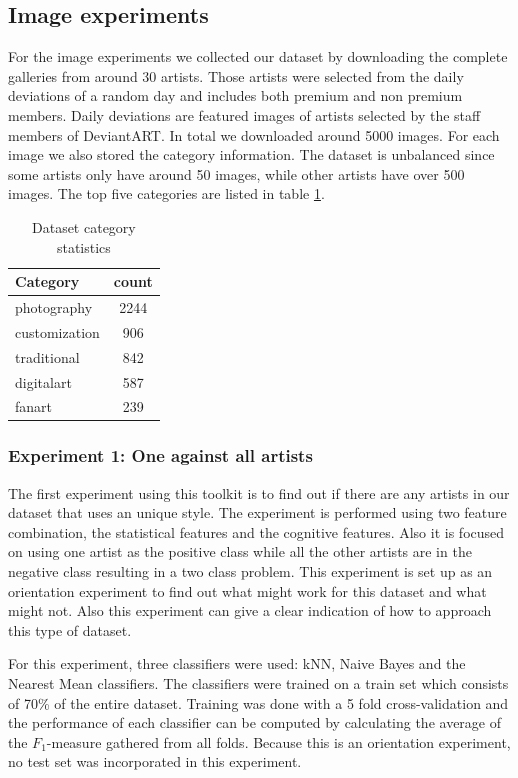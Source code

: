 \subsection{Image experiments}
For the image experiments we collected our dataset by downloading the complete galleries from around 30 artists.
Those artists were selected from the daily deviations of a random day and includes both premium and non premium members.
Daily deviations are featured images of artists selected by the staff members of DeviantART.
In total we downloaded around 5000 images. 
For each image we also stored the category information.
The dataset is unbalanced since some artists only have around 50 images, while other artists have over 500 images.
The top five categories are listed in table \ref{datasetstats}.

\begin{table}[htb]
    \centering
    \begin{tabular}
        { | l | c | } 
        \hline
        Category & count \\
        \hline
        photography & 2244 \\ 
        customization & 906 \\ 
        traditional & 842 \\ 
        digitalart & 587 \\ 
        fanart & 239 \\ 
        \hline 
    \end{tabular}
    \caption{Dataset category statistics}
    \label{datasetstats}
\end{table}

\subsubsection{Experiment 1: One against all artists}

The first experiment using this toolkit is to find out if there are any artists in our dataset that uses an unique style.
The experiment is performed using two feature combination, the statistical features and the cognitive features.
Also it is focused on using one artist as the positive class while all the other artists are in the negative class resulting in a two class problem.
This experiment is set up as an orientation experiment to find out what might work for this dataset and what might not.
Also this experiment can give a clear indication of how to approach this type of dataset.

For this experiment, three classifiers were used: kNN, Naive Bayes and the Nearest Mean classifiers.
The classifiers were trained on a train set which consists of 70\% of the entire dataset.
Training was done with a 5 fold cross-validation and the performance of each classifier can be computed by calculating the average of the $F_1$-measure gathered from all folds.
Because this is an orientation experiment, no test set was incorporated in this experiment.

